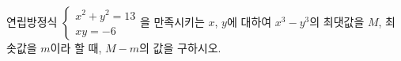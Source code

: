 연립방정식 $\begin{cases} x^2+y^2=13 \\ xy=-6 \end{cases}$을 만족시키는 $x$, $y$에 대하여 $x^3-y^3$의 최댓값을 $M$, 최솟값을 $m$이라 할 때, $M-m$의 값을 구하시오.
